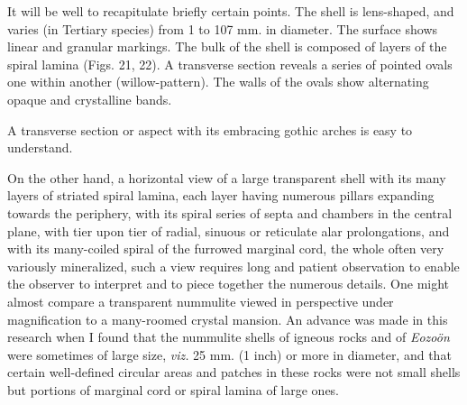 \documentclass[a4paper, 12pt, oneside, landscape]{article}
\begin{document}
It will be well to recapitulate briefly certain points. The shell is lens-shaped, and varies (in Tertiary species) from 1 to 107 mm. in diameter. The surface shows linear and granular markings. The bulk of the shell is composed of layers of the spiral lamina (Figs. 21, 22). A transverse section reveals a series of pointed ovals one within another (willow-pattern). The walls of the ovals show alternating opaque and crystalline bands.

A transverse section or aspect with its embracing gothic arches is easy to understand.

On the other hand, a horizontal view of a large transparent shell with its many layers of striated spiral lamina, each layer having numerous pillars expanding towards the periphery, with its spiral series of septa and chambers in the central plane, with tier upon tier of radial, sinuous or reticulate alar prolongations, and with its many-coiled spiral of the furrowed marginal cord, the whole often very variously mineralized, such a view requires long and patient observation to enable the observer to interpret and to piece together the numerous details. One might almost compare a transparent nummulite viewed in perspective under magnification to a many-roomed crystal mansion. An advance was made in this research when I found that the nummulite shells of igneous rocks and of \emph{Eozoön} were sometimes of large size, \emph{viz.} 25 mm. (1 inch) or more in diameter, and that certain well-defined circular areas and patches in these rocks were not small shells but portions of marginal cord or spiral lamina of large ones.
\end{document}
